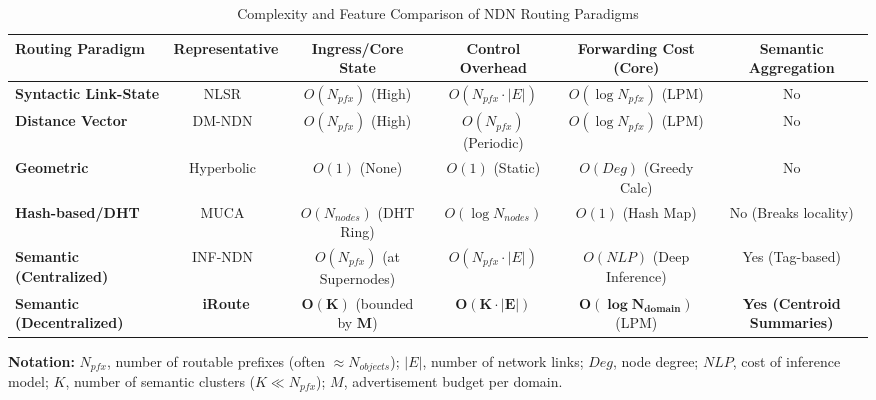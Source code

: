 \documentclass[conference]{IEEEtran}
\begin{document}
\begin{table}[t]
\centering
\caption{Complexity and Feature Comparison of NDN Routing Paradigms}
\label{tab:complexity}

\footnotesize
\setlength{\tabcolsep}{4pt}
\renewcommand{\arraystretch}{1.35}

\begin{tabular*}{\textwidth}{@{\extracolsep{\fill}}lccccc@{}}
\toprule
\textbf{Routing Paradigm} &
\textbf{Representative} &
\textbf{Ingress/Core State} &
\textbf{Control Overhead} &
\textbf{Forwarding Cost (Core)} &
\textbf{Semantic Aggregation} \\
\midrule

\textbf{Syntactic Link-State} &
NLSR~\cite{nlsr} &
$O(N_{pfx})$ (High) &
$O(N_{pfx}\!\cdot\!|E|)$ &
$O(\log N_{pfx})$ (LPM) &
No \\

\textbf{Distance Vector} &
DM-NDN~\cite{distance_vector} &
$O(N_{pfx})$ (High) &
$O(N_{pfx})$ (Periodic) &
$O(\log N_{pfx})$ (LPM) &
No \\

\textbf{Geometric} &
Hyperbolic~\cite{hyperbolic} &
$O(1)$ (None) &
$O(1)$ (Static) &
$O(Deg)$ (Greedy Calc) &
No \\

\textbf{Hash-based/DHT} &
MUCA~\cite{muca} &
$O(N_{nodes})$ (DHT Ring) &
$O(\log N_{nodes})$ &
$O(1)$ (Hash Map) &
No (Breaks locality) \\

\textbf{Semantic (Centralized)} &
INF-NDN~\cite{inf_ndn_iot} &
$O(N_{pfx})$ (at Supernodes) &
$O(N_{pfx}\!\cdot\!|E|)$ &
$O(NLP)$ (Deep Inference) &
Yes (Tag-based) \\

\textbf{Semantic (Decentralized)} &
\textbf{iRoute} &
$\mathbf{O(K)}$ (bounded by $\mathbf{M}$) &
$\mathbf{O(K\!\cdot\!|E|)}$ &
$\mathbf{O(\log N_{domain})}$ (LPM) &
\textbf{Yes (Centroid Summaries)} \\
\bottomrule
\end{tabular*}

\vspace{2pt}
\begin{minipage}{\textwidth}
\scriptsize
\textbf{Notation:}
$N_{pfx}$, number of routable prefixes (often $\approx N_{objects}$);
$|E|$, number of network links;
$Deg$, node degree;
$NLP$, cost of inference model;
$K$, number of semantic clusters ($K \ll N_{pfx}$);
$M$, advertisement budget per domain.
\end{minipage}

\vspace{-2mm}
\end{table}
\end{document}
